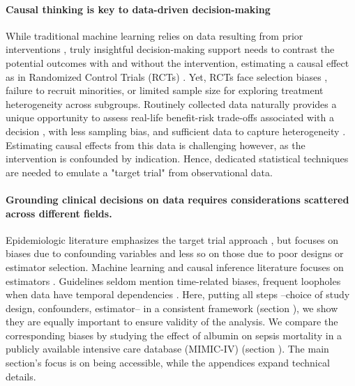 \documentclass[10pt,letterpaper]{article}
\begin{document}
\paragraph{Causal thinking is key to data-driven decision-making} \cite{prosperi2020causal}
While traditional machine learning relies on data
resulting from prior interventions \cite{plecko2022causal}, truly insightful decision-making
support needs to contrast the potential outcomes with and without the
intervention, estimating a causal effect as in Randomized Control Trials (RCTs)
\cite{prosperi2020causal}.
Yet, RCTs face selection biases \cite{travers2007external,averitt2020translating}, failure to
recruit minorities, or limited sample size for exploring treatment heterogeneity
across subgroups. Routinely collected data naturally provides a unique
opportunity to assess real-life benefit-risk trade-offs associated with a
decision \cite{desai2021broadening}, with less sampling bias, and sufficient data to capture
heterogeneity \cite{rekkas2023standardized}. Estimating causal effects from this data is challenging
however, as the intervention is confounded by indication. Hence, dedicated
statistical techniques are needed to emulate a "target trial" \cite{hernan2016specifying} from
observational data.

\paragraph{Grounding clinical decisions on data requires considerations scattered across different fields.}

Epidemiologic literature emphasizes the target trial approach
\cite{von2007strengthening,benchimol2015reporting,hernan2020causal,schneeweiss2021conducting, zeng2022uncovering}, but focuses on biases due to
confounding variables and less so on those due to poor designs or estimator
selection. Machine learning and causal inference literature focuses on
estimators \cite{belloni2014high, chernozhukov2018double,shalit2016tutorial,
    sharma2018tutorial,moraffah2021causal}. Guidelines seldom mention time-related
biases, frequent loopholes when data have temporal dependencies
\cite{suissa2008immortal,fu2021timing}. Here, putting all steps --choice of
study design, confounders, estimator-- in a consistent framework (section
), we show they are equally important to ensure validity
of the analysis. We compare the corresponding biases by studying the effect of
albumin on sepsis mortality in a publicly available intensive care database
(MIMIC-IV) \cite{johnson2020mimic} (section ).
The main section's focus is on being accessible, while the appendices expand
technical details.
%
\end{document}

